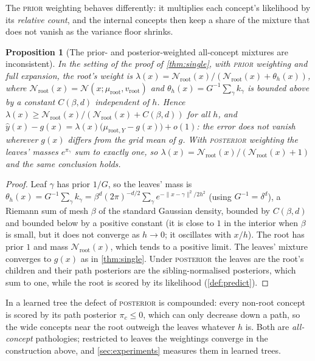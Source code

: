 \documentclass[11pt]{article}
\newtheorem{proposition}[theorem]{Proposition}
\theoremstyle{definition}
\theoremstyle{remark}
\newcommand{\N}{\mathcal{N}}
\newcommand{\hy}{\hat{y}}
\begin{document}
The \textsc{prior} weighting behaves differently: it multiplies each concept's
likelihood by its \emph{relative count}, and the internal concepts then keep a share of
the mixture that does not vanish as the variance floor shrinks.

\begin{proposition}[The prior- and posterior-weighted all-concept mixtures are inconsistent]\label{prop:prior}
In the setting of the proof of \cref{thm:single}, with \textsc{prior} weighting and full
expansion, the root's weight is
$\lambda(x)=\N_{\text{root}}(x)/(\N_{\text{root}}(x)+\theta_h(x))$, where
$\N_{\text{root}}(x)=\N(x;\mu_{\text{root}},v_{\text{root}})$ and
$\theta_h(x)=G^{-1}\sum_\gamma k_\gamma$ is bounded above by a constant $C(\beta,d)$
independent of $h$.  Hence $\lambda(x)\ge\N_{\text{root}}(x)/(\N_{\text{root}}(x)+C(\beta,d))$
for all $h$, and $\hy(x)-g(x)=\lambda(x)\bigl(\mu_{\text{root},Y}-g(x)\bigr)+o(1)$: the
error does not vanish wherever $g(x)$ differs from the grid mean of $g$.  With
\textsc{posterior} weighting the leaves' masses $e^{\pi_\gamma}$ sum to exactly one, so
$\lambda(x)=\N_{\text{root}}(x)/(\N_{\text{root}}(x)+1)$ and the same conclusion holds.
\end{proposition}
\begin{proof}
Leaf $\gamma$ has prior $1/G$, so the leaves' mass is $\theta_h(x)=G^{-1}\sum_\gamma
k_\gamma=\beta^d(2\pi)^{-d/2}\sum_\gamma e^{-\|x-\gamma\|^2/2h^2}$ (using $G^{-1}=\delta^d$),
a Riemann sum of mesh $\beta$ of the standard Gaussian density, bounded by $C(\beta,d)$
and bounded below by a positive constant (it is close to $1$ in the interior when
$\beta$ is small, but it does not converge as $h\to0$; it oscillates with $x/h$).  The root has prior $1$ and mass $\N_{\text{root}}(x)$, which tends to a positive limit.
The leaves' mixture converges to $g(x)$ as in \cref{thm:single}.  Under \textsc{posterior}
the leaves are the root's children and their path posteriors are the sibling-normalised
posteriors, which sum to one, while the root is scored by its likelihood
(\cref{def:predict}).
\end{proof}

In a learned tree the defect of \textsc{posterior} is compounded: every non-root concept
is scored by its path posterior $\pi_c\le0$, which can only decrease down a path, so the
wide concepts near the root outweigh the leaves whatever $h$ is.  Both are
\emph{all-concept} pathologies; restricted to leaves the weightings converge in the
construction above, and \cref{sec:experiments} measures them in learned trees.
\end{document}
